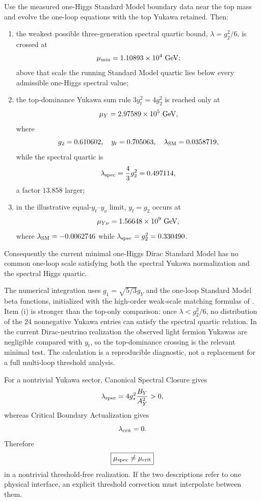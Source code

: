 \begin{theorem}
\label{thm:csc-minimal-no-intersection}
Use the measured one-Higgs Standard Model boundary data near the top mass and evolve the
one-loop equations with the top Yukawa retained.  Then:
\begin{enumerate}[label=\textup{(\roman*)},leftmargin=2.2em]
\item the weakest possible three-generation spectral quartic bound,
      $\lambda=g_2^2/6$, is crossed at
      \[
       \mu_{\rm min}=1.10893\times10^4\ {\rm GeV};
      \]
      above that scale the running Standard Model quartic lies below every admissible
      one-Higgs spectral value;
\item the top-dominance Yukawa sum rule $3y_t^2=4g_2^2$ is reached only at
      \[
       \mu_Y=2.97589\times10^5\ {\rm GeV},
      \]
      where
      \[
       g_2=0.610602,
       \quad y_t=0.705063,
       \quad \lambda_{\rm SM}=0.0358719,
      \]
      while the spectral quartic is
      \[
       \lambda_{\rm spec}=\frac43g_2^2=0.497114,
      \]
      a factor $13.858$ larger;
\item in the illustrative equal-$y_t$--$y_\nu$ limit, $y_t=g_2$ occurs at
      \[
       \mu_{Y\nu}=1.56648\times10^9\ {\rm GeV},
      \]
      where $\lambda_{\rm SM}=-0.0062746$ while
      $\lambda_{\rm spec}=g_2^2=0.330490$.
\end{enumerate}
Consequently the current minimal one-Higgs Dirac Standard Model has no common one-loop
scale satisfying both the spectral Yukawa normalization and the spectral Higgs quartic.
\end{theorem}

\begin{proofsketch}
The numerical integration uses $g_1=\sqrt{5/3}g_Y$ and the one-loop Standard Model beta
functions, initialized with the high-order weak-scale matching formulas of
\cite{buttazzo-criticality}.  Item (i) is stronger than the top-only comparison: once
$\lambda<g_2^2/6$, no distribution of the 24 nonnegative Yukawa entries can satisfy the
spectral quartic relation.  In the current Dirac-neutrino realization the observed light
fermion Yukawas are negligible compared with $y_t$, so the top-dominance crossing is the
relevant minimal test.  The calculation is a reproducible diagnostic, not a replacement for
a full multi-loop threshold analysis.
\end{proofsketch}

\begin{corollary}
\label{cor:csc-cba-separation}
For a nontrivial Yukawa sector, Canonical Spectral Closure gives
\[
 \lambda_{\rm spec}=4g_*^2\frac{B_Y}{A_Y^2}>0,
\]
whereas Critical Boundary Actualization gives
\[
 \lambda_{\rm crit}=0.
\]
Therefore
\[
 \boxed{\mu_{\rm spec}\ne\mu_{\rm crit}}
\]
in a nontrivial threshold-free realization.  If the two descriptions refer to one physical
interface, an explicit threshold correction must interpolate between them.
\end{corollary}

